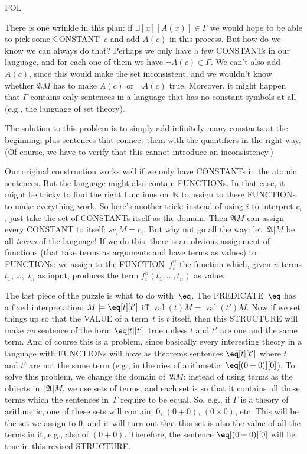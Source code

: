 \documentclass[10pt,a4paper]{article}
\newcommand*{\olup}[1]{\MakeUppercase{#1}}
\theoremstyle{plain}
\theoremstyle{definition}
\theoremstyle{remark}
\providecommand{\lexists}{\mathord{\exists}}
\providecommand{\Obj}{}
\providecommand{\Struct}{\ensuremath{\mathfrak{A}}}
\providecommand{\Domain}{\ensuremath{|\mathfrak{A}|}}
\providecommand{\Assign}{\ensuremath{s}}
\providecommand{\Sat}[2]{\ensuremath{#1 \models #2}}
\providecommand{\Nat}{\ensuremath{\mathbb{N}}}
\providecommand{\iftag}[1]{#1}
\providecommand{\Value}[1]{\operatorname{val}(#1)}
\providecommand{\iftag}{}
\begin{document}
\iftag{FOL}{%
There is one wrinkle in this plan: if $\lexists[x][A(x)] \in \Gamma$
we would hope to be able to pick some \olup{constant}~$c$ and add $A(c)$
in this process.  But how do we know we can always do that?  Perhaps we
only have a few \olup{constant}s in our language, and for each one of
them we have $\lnot A(c) \in \Gamma$.  We can't also add $A(c)$,
since this would make the set inconsistent, and we wouldn't know
whether $\Struct{M}$ has to make $A(c)$ or $\lnot A(c)$ true.
Moreover, it might happen that $\Gamma$ contains only sentences in a
language that has no constant symbols at all (e.g., the language of
set theory).

The solution to this problem is to simply add infinitely many
constants at the beginning, plus sentences that connect them with the
quantifiers in the right way.  (Of course, we have to verify that this
cannot introduce an inconsistency.)

Our original construction works well if we only have \olup{constant}s in
the atomic sentences.  But the language might also contain
\olup{function}s.  In that case, it might be tricky to find the right
functions on~$\Nat$ to assign to these \olup{function}s to make
everything work.  So here's another trick: instead of using $i$ to
interpret $\Obj c_i$, just take the set of \olup{constant}s itself as the
domain.  Then $\Struct M$ can assign every \olup{constant} to itself:
$\Assign{\Obj c_i}{M} = \Obj c_i$.  But why not go all the way: let
$\Domain{M}$ be all \emph{terms} of the language!{} If we do this,
there is an obvious assignment of functions (that take terms as
arguments and have terms as values) to \olup{function}s: we assign to the
\olup{function}~$\Obj f^n_i$ the function which, given $n$ terms $t_1$,
\dots,~$t_n$ as input, produces the term $\Obj f^n_i(t_1, \dots, t_n)$
as value.

The last piece of the puzzle is what to do with~$\eq$.  The
\olup{predicate}~$\eq$ has a fixed interpretation: $\Sat{M}{\eq[t][t']}$
iff $\Value{t}{M} = \Value{t'}{M}$.  Now if we set things up so that the
\olup{value} of a term~$t$ is $t$ itself, then this \olup{structure}
will make \emph{no} sentence of the form $\eq[t][t']$ true
unless $t$ and $t'$ are one and the same term.  And of
course this is a problem, since basically every interesting theory in
a language with \olup{function}s will have as theorems sentences
$\eq[t][t']$ where $t$ and $t'$ are not the same term (e.g., in
theories of arithmetic: $\eq[(\Obj 0+ \Obj 0)][\Obj 0]$).  To solve
this problem, we change the domain of~$\Struct M$: instead of using terms as
the objects in~$\Domain{M}$, we use sets of terms, and each set is so
that it contains all those terms which the sentences in~$\Gamma$
require to be equal.  So, e.g., if $\Gamma$ is a theory of arithmetic,
one of these sets will contain: $\Obj 0$, $(\Obj 0 + \Obj 0)$, $(\Obj
0 \times \Obj 0)$, etc.  This will be the set we assign to $\Obj 0$,
and it will turn out that this set is also the value of all the terms
in it, e.g., also of $(\Obj 0 + \Obj 0)$.  Therefore, the sentence
$\eq[(\Obj 0+ \Obj 0)][\Obj 0]$ will be true in this revised
\olup{structure}.}{}
\end{document}
